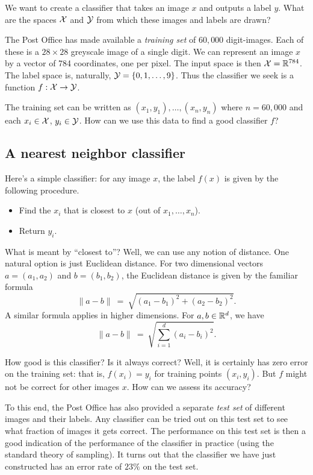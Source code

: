 We want to create a classifier that takes an image $x$ and outputs a label $y$.
What are the spaces ${\cal X}$ and ${\cal Y}$ from which these images and labels are drawn?

The Post Office has made available a {\it training set} of $60{,}000$ digit-images. 
Each of these is a $28 \times 28$ greyscale image of a single digit. We can represent 
an image $x$ by a vector of 784 coordinates, one per pixel. The input space is then
${\cal X} = \mathbb{R}^{784}$. The label space is, naturally, ${\cal Y} = \{0,1,\ldots, 9\}$. Thus the 
classifier we seek is a function $f: {\cal X} \rightarrow {\cal Y}$.

The training set can be written as $(x_1, y_1), \ldots, (x_n,y_n)$ where $n = 60{,}000$
and each $x_i \in {\cal X}$, $y_i \in {\cal Y}$. How can we use this data to find a good classifier
$f$?

\subsection{A nearest neighbor classifier}

Here's a simple classifier: for any image $x$, the label $f(x)$ is given by the 
following procedure.
\begin{itemize}
\item Find the $x_i$ that is closest to $x$ (out of $x_1, \ldots, x_n$).
\item Return $y_i$.
\end{itemize}
What is meant by ``closest to''? Well, we can use any notion of distance. One
natural option is just Euclidean distance. For two dimensional vectors 
$a = (a_1, a_2)$ and $b = (b_1, b_2)$, the Euclidean distance is given by the
familiar formula
$$ \|a - b\| \ = \ \sqrt{(a_1 - b_1)^2 + (a_2 - b_2)^2} .$$
A similar formula applies in higher dimensions. For $a,b \in \mathbb{R}^d$, we have
$$ \|a - b\| \ = \ \sqrt{\sum_{i=1}^d (a_i- b_i)^2} .$$

How good is this classifier? Is it always correct? Well, it is certainly
has zero error on the training set: that is, $f(x_i) = y_i$ for training 
points $(x_i, y_i)$. But $f$ might not be correct for other images $x$. 
How can we assess its accuracy?

To this end, the Post Office has also provided a separate {\it test set} of
different images and their labels. Any classifier can be tried out on this
test set to see what fraction of images it gets correct. The performance on
this test set is then a good indication of the performance of the classifier
in practice (using the standard theory of sampling). It turns out that
the classifier we have just constructed has an error rate of $23\%$ on the
test set.

